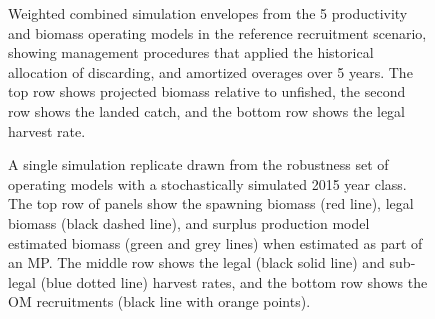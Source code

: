 \documentclass[11pt]{book}
\begin{document}
\begin{landscape}
\begin{figure}[htb]
{}

\caption{Weighted combined simulation envelopes from the 5 productivity and biomass operating models in the reference recruitment scenario, showing management procedures that applied the historical allocation of discarding, and amortized overages over 5 years. The top row shows projected biomass relative to unfished, the second row shows the landed catch, and the bottom row shows the legal harvest rate.}\label{fig:unnamed-chunk-23}
\end{figure}
\newpage
\begin{figure}[htb]

{\centering {} 

}

\caption{A single simulation replicate drawn from the robustness set of operating models with a stochastically simulated 2015 year class. The top row of panels show the spawning biomass (red line), legal biomass (black dashed line), and surplus production model estimated biomass (green and grey lines) when estimated as part of an MP. The middle row shows the legal (black solid line) and sub-legal (blue dotted line) harvest rates, and the bottom row shows the OM recruitments (black line with orange points).}\label{fig:unnamed-chunk-24}
\end{figure}
\newpage
\begin{figure}[htb]


\end{figure}
\end{landscape}
\end{document}
